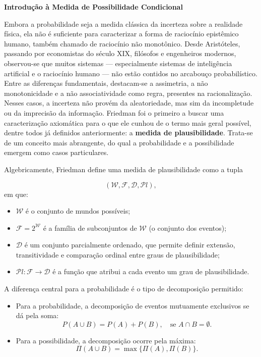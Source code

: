 \documentclass[a4paper]{article}
\begin{document}
    \begin{answer}[Questão 01]


\textbf{Introdução à Medida de Possibilidade Condicional}

Embora a probabilidade seja a medida clássica da incerteza sobre a realidade física, ela não é suficiente para caracterizar a forma de raciocínio epistêmico humano, também chamado de raciocínio não monotônico. Desde Aristóteles, passando por economistas do século XIX, filósofos e engenheiros modernos, observou-se que muitos sistemas — especialmente sistemas de inteligência artificial e o raciocínio humano — não estão contidos no arcabouço probabilístico. Entre as diferenças fundamentais, destacam-se a assimetria, a não monotonicidade e a não associatividade como regra, presentes na racionalização.
Nesses casos, a incerteza não provém da aleatoriedade, mas sim da incompletude ou da imprecisão da informação. Friedman foi o primeiro a buscar uma caracterização axiomática para o que ele cunhou de o termo mais geral possível, dentre todos já definidos anteriormente: a \textbf{medida de plausibilidade}. Trata-se de um conceito mais abrangente, do qual a probabilidade e a possibilidade emergem como casos particulares. 

Algebricamente, Friedman define uma medida de plausibilidade como a tupla

\[
(\mathcal{W}, \mathcal{F}, \mathcal{D}, \mathcal{P}l),
\]
em que:
\begin{itemize}
    \item $\mathcal{W}$ é o conjunto de mundos possíveis;
    \item $\mathcal{F} = 2^{\mathcal{W}}$ é a família de subconjuntos de $\mathcal{W}$ (o conjunto dos eventos);
    \item $\mathcal{D}$ é um conjunto parcialmente ordenado, que permite definir extensão, transitividade e comparação ordinal entre graus de plausibilidade;
    \item $\mathcal{P}l: \mathcal{F} \to \mathcal{D}$ é a função que atribui a cada evento um grau de plausibilidade.
\end{itemize}

A diferença central para a probabilidade é o tipo de decomposição permitido:
\begin{itemize}
    \item Para a probabilidade, a decomposição de eventos mutuamente exclusivos se dá pela soma:
    \[
        P(A \cup B) = P(A) + P(B), \quad \text{se } A \cap B = \emptyset.
    \]
    \item Para a possibilidade, a decomposição ocorre pela máxima:
    \[
        \Pi(A \cup B) = \max\{\Pi(A), \Pi(B)\}.
    \]
\end{itemize}


\end{answer}
\end{document}
